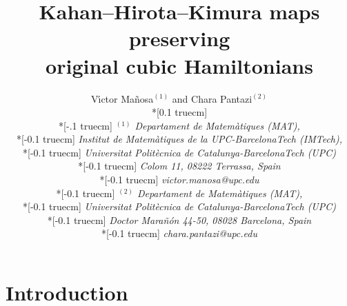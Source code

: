\documentclass[11pt]{article}
\begin{document}
\title{Kahan--Hirota--Kimura maps preserving\\ original cubic Hamiltonians}
\author{ V\'{\i}ctor Ma\~{n}osa$^{(1)}$ and Chara Pantazi$^{(2)}$
    \\*[0.1 truecm]
    \\*[-.1 truecm] {\small \textsl{$^{(1)}$ Departament de Matem\`{a}tiques (MAT),}}
     \\*[-0.1 truecm] {\small \textsl{Institut de Matem\`{a}tiques de la UPC-BarcelonaTech (IMTech),}}
    \\*[-0.1 truecm] {\small \textsl{Universitat Polit\`{e}cnica de Catalunya-BarcelonaTech (UPC)}}
    \\*[-0.1 truecm] {\small \textsl{Colom 11, 08222 Terrassa, Spain}}
    \\*[-0.1 truecm] {\small \textsl{victor.manosa@upc.edu}}
        \\*[-0.1 truecm] {\small \textsl{$^{(2)}$ Departament de Matem\`{a}tiques (MAT),}}
    \\*[-0.1 truecm] {\small \textsl{Universitat Polit\`{e}cnica de Catalunya-BarcelonaTech (UPC)}}
    \\*[-0.1 truecm] {\small \textsl{Doctor Mara\~{n}\'on 44-50,
08028 Barcelona, Spain}}
    \\*[-0.1 truecm] {\small \textsl{chara.pantazi@upc.edu}}}



\maketitle





\section{Introduction}\label{s:intro}
\end{document}
